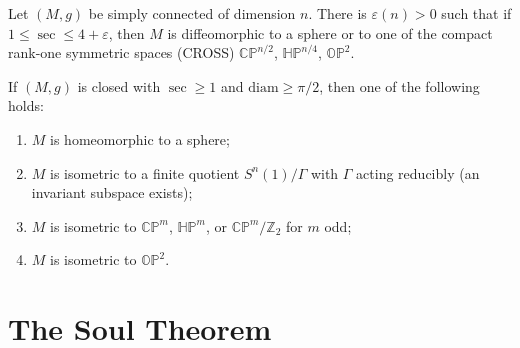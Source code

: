 \begin{theorem}
  \label{thm:pet-ch12-cross-pinching}
  Let $(M,g)$ be simply connected of dimension $n$. There is $\varepsilon(n)>0$
  such that if $1\le\sec\le4+\varepsilon$, then $M$ is diffeomorphic to a sphere
  or to one of the compact rank-one symmetric spaces (CROSS) $\mathbb{CP}^{n/2}$,
  $\mathbb{HP}^{n/4}$, $\mathbb{OP}^2$.
\end{theorem}

\begin{theorem}
  \label{thm:pet-ch12-diameter-classification}
  If $(M,g)$ is closed with $\sec\ge1$ and $\mathrm{diam}\ge\pi/2$, then one of
  the following holds:
  \begin{enumerate}
    \item $M$ is homeomorphic to a sphere;
    \item $M$ is isometric to a finite quotient $S^n(1)/\Gamma$ with $\Gamma$
      acting reducibly (an invariant subspace exists);
    \item $M$ is isometric to $\mathbb{CP}^m$, $\mathbb{HP}^m$, or
      $\mathbb{CP}^m/\mathbb{Z}_2$ for $m$ odd;
    \item $M$ is isometric to $\mathbb{OP}^2$.
  \end{enumerate}
\end{theorem}

\section{The Soul Theorem}

